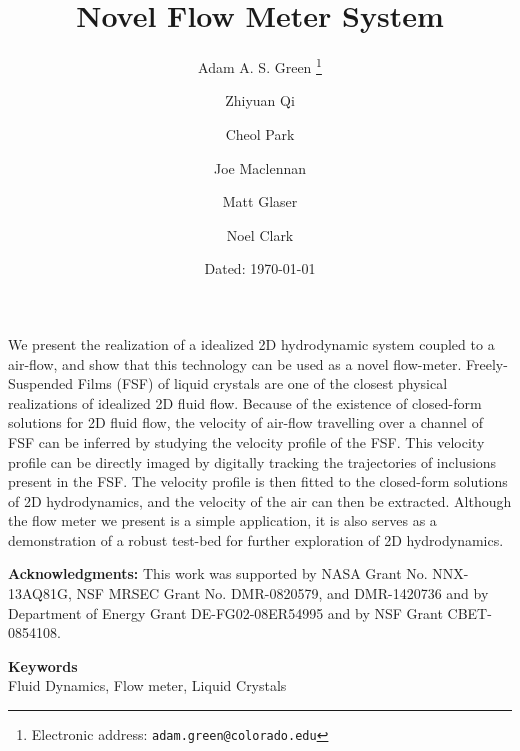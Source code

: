 \documentclass{article} %
\date{} %
\def\keywords#1{\begin{center}{\bf Keywords}\\{#1}\end{center}} %
\begin{document}
\title{Novel Flow Meter System}

\author{Adam A. S. Green%
\thanks{Electronic address: \texttt{adam.green@colorado.edu}}}
\author{Zhiyuan Qi}
\author{Cheol Park}
\author{Joe Maclennan}
\author{Matt Glaser}
\author{Noel Clark}

 
\date{Dated: \today}

\maketitle

\thispagestyle{empty}



\begin{doublespace}
\noindent We present the realization of a idealized 2D hydrodynamic system
coupled to a air-flow, and show that this technology can be used as a novel flow-meter.
Freely-Suspended Films (FSF) of liquid crystals are one of the closest physical realizations of
idealized 2D fluid flow. Because of the  existence of closed-form solutions for 2D
fluid flow, the velocity of air-flow travelling over a channel of FSF can be
inferred by studying the velocity profile of the FSF. This velocity profile can be
directly imaged by digitally tracking the trajectories of inclusions present in the FSF. The velocity profile is then fitted to the
closed-form solutions of 2D hydrodynamics, and the velocity of the air can
then be extracted. Although the flow meter we present is a simple
application, it is also serves as a demonstration
of a robust test-bed for further exploration of 2D hydrodynamics.
\end{doublespace}
\textbf{Acknowledgments:} This work was supported by NASA Grant No. NNX-13AQ81G,
NSF MRSEC Grant No. DMR-0820579, and DMR-1420736 and by Department of Energy
Grant DE-FG02-08ER54995 and by NSF Grant CBET-0854108.

\vspace{20 mm}

\keywords{Fluid Dynamics, Flow meter, Liquid Crystals} %


                    
\end{document}
